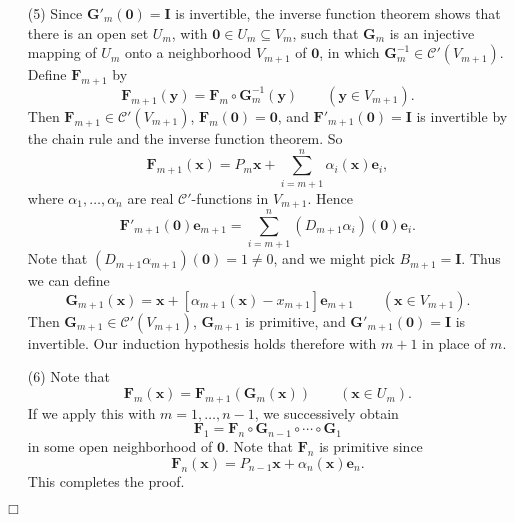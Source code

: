 \documentclass{article}
\begin{document}
\begin{enumerate}
\item[(5)]
  Since $\mathbf{G}'_{m}(\mathbf{0}) = \mathbf{I}$ is invertible,
  the inverse function theorem shows that there is an open set $U_{m}$,
  with $\mathbf{0} \in U_{m} \subseteq V_{m}$, such that
  $\mathbf{G}_m$ is an injective mapping of $U_{m}$ onto a neighborhood $V_{m+1}$ of $\mathbf{0}$,
  in which $\mathbf{G}_m^{-1} \in \mathscr{C}'(V_{m+1})$.
  Define $\mathbf{F}_{m+1}$ by
  \[
    \mathbf{F}_{m+1}(\mathbf{y}) = \mathbf{F}_{m} \circ \mathbf{G}_m^{-1}(\mathbf{y})
    \qquad
    (\mathbf{y} \in V_{m+1}).
  \]
  Then $\mathbf{F}_{m+1} \in \mathscr{C}'(V_{m+1})$, $\mathbf{F}_m(\mathbf{0}) = \mathbf{0}$,
  and $\mathbf{F}'_{m+1}(\mathbf{0}) = \mathbf{I}$ is invertible by the chain rule
  and the inverse function theorem.
  So
  \[
    \mathbf{F}_{m+1}(\mathbf{x})
    = P_m \mathbf{x}
      + \sum_{i=m+1}^{n} \alpha_i(\mathbf{x}) \mathbf{e}_i,
  \]
  where $\alpha_1, \ldots, \alpha_n$ are real $\mathscr{C}'$-functions in $V_{m+1}$.
  Hence
  \[
    \mathbf{F}'_{m+1}(\mathbf{0})\mathbf{e}_{m+1}
    = \sum_{i=m+1}^{n} (D_{m+1} \alpha_i)(\mathbf{0}) \mathbf{e}_i.
  \]
  Note that $(D_{m+1} \alpha_{m+1})(\mathbf{0}) = 1 \neq 0$,
  and we might pick $B_{m+1} = \mathbf{I}$.
  Thus we can define
  \[
    \mathbf{G}_{m+1}(\mathbf{x})
    = \mathbf{x} + [\alpha_{m+1}(\mathbf{x}) - x_{m+1}] \mathbf{e}_{m+1}
    \qquad
    (\mathbf{x} \in V_{m+1}).
  \]
  Then $\mathbf{G}_{m+1} \in \mathscr{C}'(V_{m+1})$, $\mathbf{G}_{m+1}$ is primitive,
  and $\mathbf{G}'_{m+1}(\mathbf{0}) = \mathbf{I}$ is invertible.
  Our induction hypothesis holds therefore with $m+1$ in place of $m$.

\item[(6)]
  Note that
  \[
    \mathbf{F}_{m}(\mathbf{x}) = \mathbf{F}_{m+1}(\mathbf{G}_{m}(\mathbf{x}))
    \qquad
    (\mathbf{x} \in U_{m}).
  \]
  If we apply this with $m = 1, \ldots, n-1$, we successively obtain
  \[
    \mathbf{F}_1
    = \mathbf{F}_{n} \circ \mathbf{G}_{n-1} \circ \cdots \circ \mathbf{G}_1
  \]
  in some open neighborhood of $\mathbf{0}$.
  Note that $\mathbf{F}_{n}$ is primitive since
  \[
    \mathbf{F}_{n}(\mathbf{x})
    = P_{n-1} \mathbf{x} + \alpha_n(\mathbf{x}) \mathbf{e}_n.
  \]
  This completes the proof.
\end{enumerate}
$\Box$ \\
\end{document}
